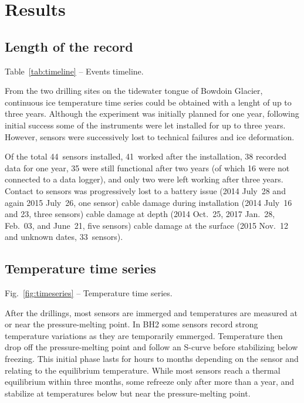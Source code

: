 \documentclass[utf8]{article}
\begin{document}
\section{Results}

\subsection{Length of the record}

    Table~\ref{tab:timeline} -- Events timeline.

    From the two drilling sites on the tidewater tongue of Bowdoin Glacier,
    continuous ice temperature time series could be obtained with a lenght of
    up to three years. Although the experiment was initially planned for one
    year, following initial success some of the instruments were let installed
    for up to three years. However, sensors were successively lost to technical
    failures and ice deformation.

    Of the total 44~sensors installed, 41~worked after the installation, 38
    recorded data for one year, 35 were still functional after two years (of
    which 16 were not connected to a data logger), and only two were left
    working after three years. Contact to sensors was progressively lost to a
    battery issue (2014 July~28 and again 2015 July~26, one sensor) cable
    damage during installation (2014 July~16 and 23, three sensors) cable
    damage at depth (2014 Oct.~25, 2017 Jan.~28, Feb.~03, and June~21, five
    sensors) cable damage at the surface (2015 Nov.~12 and unknown dates,
    33~sensors).


\subsection{Temperature time series}

    Fig.~\ref{fig:timeseries} -- Temperature time series.

    After the drillings, most sensors are immerged and temperatures are
    measured at or near the pressure-melting point. In BH2 some sensors record
    strong temperature variations as they are temporarily emmerged. Temperature
    then drop off the pressure-melting point and follow an S-curve before
    stabilizing below freezing. This initial phase lasts for hours to months
    depending on the sensor and relating to the equilibrium temperature. While
    most sensors reach a thermal equilibrium within three months, some refreeze
    only after more than a year, and stabilize at temperatures below but near
    the pressure-melting point.
\end{document}
